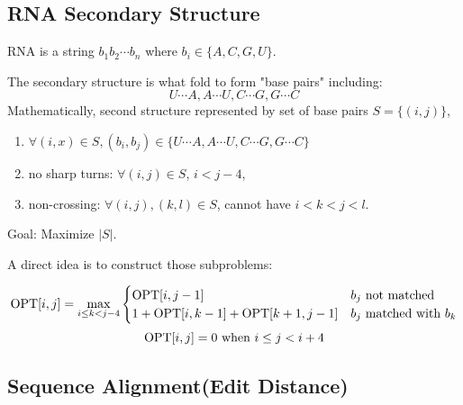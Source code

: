 \subsection{RNA Secondary Structure}
\begin{example}
    RNA is a string  $ b_1b_2\cdots b_n $  where  $ b_i\in \{A,C,G,U\} $.
    
    The secondary structure is what fold to form "base pairs" including:
    \[U\cdots A,A\cdots U,C\cdots G,G\cdots C\]
    Mathematically, second structure represented by set of base pairs  $ S=\{(i,j)\} $, 
    \begin{enumerate}[label=*)]
        \item  $ \forall (i,x)\in S,(b_i,b_j)\in \{U\cdots A,A\cdots U,C\cdots G,G\cdots C\} $
        \item no sharp turns:  $ \forall (i,j)\in S $,  $ i<j-4 $,
        \item non-crossing:  $ \forall (i,j),(k,l)\in S $, cannot have  $ i<k<j<l $.     
    \end{enumerate} 
    Goal: Maximize  $ |S| $. 
\end{example}

A direct idea is to construct those subproblems:

\[\mathrm{OPT}[i,j]=\max_{i \leq k<j-4}\begin{cases}
    \mathrm{OPT}[i,j-1] &b_j \text{ not matched}\\
    1+\mathrm{OPT}[i,k-1]+\mathrm{OPT}[k+1,j-1] &b_j\text{ matched with }b_k
\end{cases}\]
\[\mathrm{OPT}[i,j]=0\text{ when }i \leq j<i+4\]


\subsection{Sequence Alignment(Edit Distance)}


